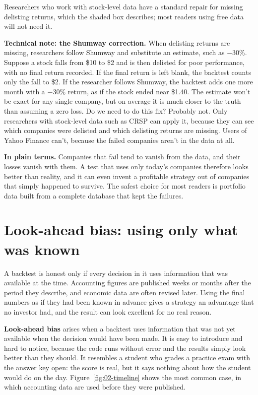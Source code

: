 Researchers who work with stock-level data have a standard repair for missing delisting returns, which the shaded box describes; most readers using free data will not need it.

\begin{technote}
\textbf{Technical note: the Shumway correction.} When delisting returns are missing, researchers follow Shumway and substitute an estimate, such as $-30$\%.
Suppose a stock falls from \$10 to \$2 and is then delisted for poor performance, with no final return recorded.
If the final return is left blank, the backtest counts only the fall to \$2.
If the researcher follows Shumway, the backtest adds one more month with a $-30$\% return, as if the stock ended near \$1.40.
The estimate won’t be exact for any single company, but on average it is much closer to the truth than assuming a zero loss.
Do we need to do this fix? Probably not. Only researchers with stock-level data such as CRSP can apply it, because they can see which companies were delisted and which delisting returns are missing. Users of Yahoo Finance can’t, because the failed companies aren’t in the data at all.
\end{technote}

\noindent\textbf{In plain terms.} Companies that fail tend to vanish from the data, and their losses vanish with them. A test that uses only today's companies therefore looks better than reality, and it can even invent a profitable strategy out of companies that simply happened to survive. The safest choice for most readers is portfolio data built from a complete database that kept the failures.


\section{Look-ahead bias: using only what was known}
\label{sec:02-lookahead}

A backtest is honest only if every decision in it uses information that was available at the time. Accounting figures are published weeks or months after the period they describe, and economic data are often revised later. Using the final numbers as if they had been known in advance gives a strategy an advantage that no investor had, and the result can look excellent for no real reason.

\textbf{Look-ahead bias} arises when a backtest uses information that was not yet available when the decision would have been made. It is easy to introduce and hard to notice, because the code runs without error and the results simply look better than they should. It resembles a student who grades a practice exam with the answer key open: the score is real, but it says nothing about how the student would do on the day. Figure~\ref{fig:02-timeline} shows the most common case, in which accounting data are used before they were published.

